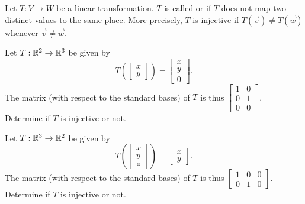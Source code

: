 
\begin{applicationActivities}{2}{18}

\begin{definition}
Let $T: V \rightarrow W$ be a linear transformation.
$T$ is called  or  if $T$ does not map two distinct values to the same place.  More precisely, $T$ is injective if $T(\vec{v}) \neq T(\vec{w})$ whenever $\vec{v} \neq \vec{w}$.
\end{definition}

\begin{activity}{5}
Let $T: \mathbb{R}^2 \rightarrow \mathbb{R}^3$ be given by $$T\left(\begin{bmatrix}x \\ y \end{bmatrix} \right) = \begin{bmatrix} x \\ y \\ 0 \end{bmatrix}.$$
The matrix (with respect to the standard bases) of $T$ is thus $\begin{bmatrix} 1 & 0 \\ 0 & 1 \\ 0 & 0 \end{bmatrix}$. \\
Determine if $T$ is injective or not.
\end{activity}

\begin{activity}{5}
Let $T: \mathbb{R}^3 \rightarrow \mathbb{R}^2$ be given by $$T\left(\begin{bmatrix} x \\ y \\ z \end{bmatrix} \right) = \begin{bmatrix} x \\ y \end{bmatrix}.$$  The matrix (with respect to the standard bases) of $T$ is thus $\begin{bmatrix} 1 & 0 &0  \\ 0 & 1 & 0 \end{bmatrix}$.\\
Determine if $T$ is injective or not.
\end{activity}


\end{applicationActivities}
